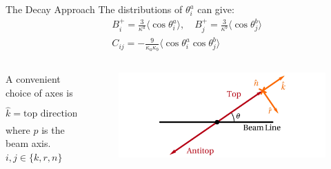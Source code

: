 \documentclass{beamer}
\begin{document}
    \begin{frame}{The Decay Approach}
        The distributions of $\theta^a_i$ can give:
        \begin{eqnarray}
            && B^+_i = \frac{3}{\kappa^a}\langle\cos{\theta^a_i}\rangle, \quad B^+_j = \frac{3}{\kappa^b}\langle\cos{\theta^b_j} \rangle \nonumber \\
            && C_{ij} = -\frac{9}{\kappa_a\kappa_b}\langle\cos{\theta^a_i}\cos{\theta^b_j} \rangle \nonumber 
        \end{eqnarray} 
        \begin{columns}
        \begin{column}{0.6\textwidth}
            A convenient choice of axes is
            \begin{equation*}
                \hat{k} = \text{top direction}, \quad \hat{r} = \frac{\hat{p}-\hat{k}\cos{\theta}}{\sin\theta}, \quad \hat{n} = \hat{k}\times\hat{r},
            \end{equation*}
            where $\hat{p}$ is the beam axis. $i,j\in\{k,r,n\}$          
        \end{column}
        \begin{column}{0.4\textwidth}
            \begin{figure}[htbp]
                \centering
                \includegraphics[width=\linewidth]{img/axis-choice.png}
            \end{figure}     
        \end{column}       
        \end{columns}
        \begin{center}
            \footnotesize {}
        \end{center}  
    \end{frame}
\end{document}
